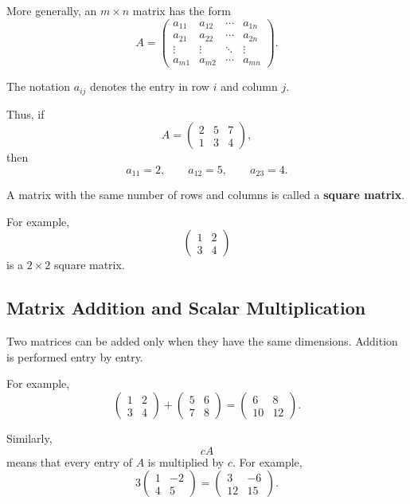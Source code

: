 \documentclass[11pt]{article}
\theoremstyle{definition}
\theoremstyle{plain}
\theoremstyle{remark}
\begin{document}
More generally, an $m\times n$ matrix has the form
\[
A=
\begin{pmatrix}
a_{11} & a_{12} & \cdots & a_{1n}\\
a_{21} & a_{22} & \cdots & a_{2n}\\
\vdots & \vdots & \ddots & \vdots\\
a_{m1} & a_{m2} & \cdots & a_{mn}
\end{pmatrix}.
\]

The notation $a_{ij}$ denotes the entry in row $i$ and column $j$.

Thus, if
\[
A=
\begin{pmatrix}
2&5&7\\
1&3&4
\end{pmatrix},
\]
then
\[
a_{11}=2,\qquad
a_{12}=5,\qquad
a_{23}=4.
\]

A matrix with the same number of rows and columns is called a
\textbf{square matrix}.

For example,
\[
\begin{pmatrix}
1&2\\
3&4
\end{pmatrix}
\]
is a $2\times2$ square matrix.


\subsection*{Matrix Addition and Scalar Multiplication}

Two matrices can be added only when they have the same dimensions.
Addition is performed entry by entry.

For example,
\[
\begin{pmatrix}
1&2\\
3&4
\end{pmatrix}
+
\begin{pmatrix}
5&6\\
7&8
\end{pmatrix}
=
\begin{pmatrix}
6&8\\
10&12
\end{pmatrix}.
\]

Similarly,
\[
cA
\]
means that every entry of $A$ is multiplied by $c$. For example,
\[
3
\begin{pmatrix}
1&-2\\
4&5
\end{pmatrix}
=
\begin{pmatrix}
3&-6\\
12&15
\end{pmatrix}.
\]
\end{document}
